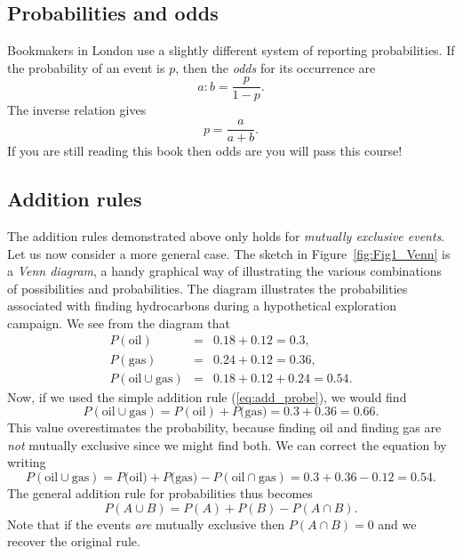 \subsection{Probabilities and odds}

Bookmakers in London use a slightly different system of reporting probabilities.
If the probability of an event is $p$, then the \emph{odds} for its occurrence are
\begin{equation}
a : b = \frac{p}{1-p}.
\end{equation}
The inverse relation gives
\begin{equation}
p = \frac{a}{a+b}.	 
\end{equation}
If you are still reading this book then odds are you will pass this course!

\subsection{Addition rules}


	The addition rules demonstrated above only holds for \emph{mutually exclusive events}.  Let us now 
consider a more general case.
The sketch in Figure~\ref{fig:Fig1_Venn} is a \emph{Venn diagram}, a handy graphical way of illustrating the various 
combinations of possibilities and probabilities.  The diagram illustrates the probabilities 
associated with finding hydrocarbons during a hypothetical exploration campaign. We see from 
the diagram that
\begin{equation}
\begin{array}{rcl}
P(\mbox{oil}) & = &0.18 + 0.12 = 0.3,\\
P(\mbox{gas}) & = & 0.24 + 0.12 = 0.36, \\
P(\mbox{oil} \cup \mbox{gas} ) & = & 0.18 + 0.12 + 0.24 = 0.54.
\end{array}
\end{equation}	 
Now, if we used the simple addition rule (\ref{eq:add_probe}), we would find
\begin{equation}
P(\mbox{oil} \cup \mbox{gas} ) = P (\mbox{oil}) + P \mbox{(gas)} = 0.3 + 0.36 = 0.66.
\end{equation}
This value overestimates the probability, because finding oil and finding gas are \emph{not} mutually 
exclusive since we might find both.  We can correct the equation by writing 
\begin{equation}
P (\mbox{oil} \cup \mbox{gas}) = P\mbox{(oil)} + P \mbox{(gas)} - P(\mbox{oil} \cap \mbox{gas}) = 0.3 + 0.36 - 0.12 = 0.54.
\end{equation}	 
The general addition rule for probabilities thus becomes
\begin{equation}
P(A\cup B) = P(A) + P(B) - P(A \cap B).
\end{equation}
Note that if the events \emph{are} mutually exclusive then 
$P(A \cap B) = 0$ and we recover the original rule.

